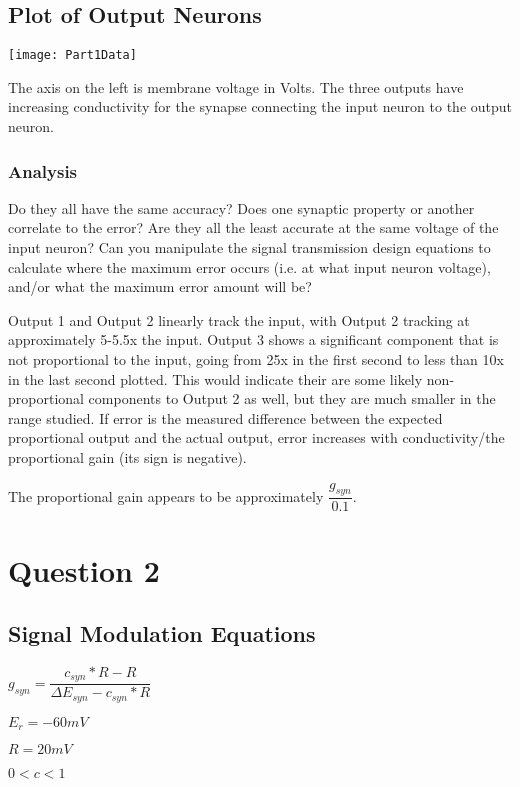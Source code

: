 \documentclass[12pt, letterpaper, oneside, notitlepage, onecolumn]{article}
\begin{document}
\subsection{Plot of Output Neurons}

\texttt{[image: Part1Data]}

The axis on the left is membrane voltage in Volts. The three outputs have increasing conductivity for the synapse connecting the input neuron to the output neuron.

\subsubsection{Analysis}

Do they all have the same accuracy? Does one synaptic property or another
correlate to the error? Are they all the least accurate at the same voltage 
of the input neuron? Can you manipulate the signal transmission design 
equations to calculate where the maximum error occurs (i.e. at what input 
neuron voltage), and/or what the maximum error amount will be?

Output 1 and Output 2 linearly track the input, with Output 2 tracking at approximately 5-5.5x the input. Output 3 shows a significant component that is not proportional to the input, going from 25x in the first second to less than 10x in the last second plotted. This would indicate their are some likely non-proportional components to Output 2 as well, but they are much smaller in the range studied. If error is the measured difference between the expected proportional output and the actual output, error increases with conductivity/the proportional gain (its sign is negative).

The proportional gain appears to be approximately $\dfrac{g_{syn}}{0.1}$.

\section{Question 2}

\subsection{Signal Modulation Equations}

$g_{syn} = \dfrac{c_{syn} * R - R}{\Delta E_{syn} - c_{syn} * R}$

$E_{r} = -60mV$

$R = 20mV$

$0 < c < 1$
\end{document}
